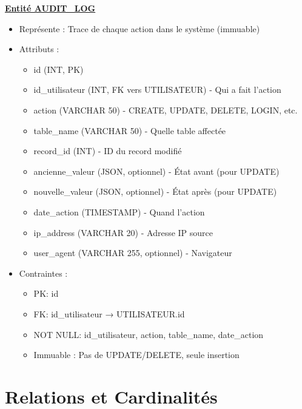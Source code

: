 \underline{\textbf{Entité AUDIT\_LOG}}
\begin{itemize}
  \item Représente : Trace de chaque action dans le système (immuable)
  \item Attributs :
    \begin{itemize}
      \item id (INT, PK)
      \item id\_utilisateur (INT, FK vers UTILISATEUR) - Qui a fait l'action
      \item action (VARCHAR 50) - CREATE, UPDATE, DELETE, LOGIN, etc.
      \item table\_name (VARCHAR 50) - Quelle table affectée
      \item record\_id (INT) - ID du record modifié
      \item ancienne\_valeur (JSON, optionnel) - État avant (pour UPDATE)
      \item nouvelle\_valeur (JSON, optionnel) - État après (pour UPDATE)
      \item date\_action (TIMESTAMP) - Quand l'action
      \item ip\_address (VARCHAR 20) - Adresse IP source
      \item user\_agent (VARCHAR 255, optionnel) - Navigateur
    \end{itemize}
  \item Contraintes :
    \begin{itemize}
      \item PK: id
      \item FK: id\_utilisateur → UTILISATEUR.id
      \item NOT NULL: id\_utilisateur, action, table\_name, date\_action
      \item Immuable : Pas de UPDATE/DELETE, seule insertion
    \end{itemize}
\end{itemize}

\section{Relations et Cardinalités}

